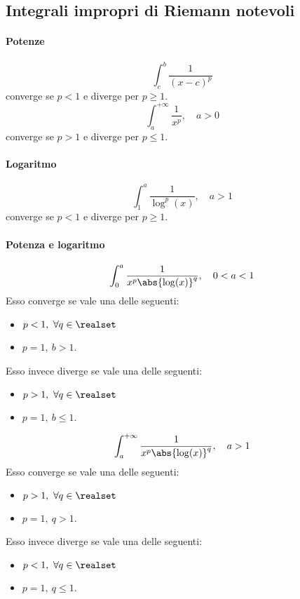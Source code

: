 \subsection{Integrali impropri di Riemann notevoli}
\paragraph{Potenze}
\begin{equation}
	\int_{c}^{b}\frac{1}{\left(x-c\right)^p}
\end{equation}
converge se $p<1$ e diverge per $p\geq 1$.
\begin{equation}
	\int_{a}^{+\infty}\frac{1}{x^p},\quad a>0
\end{equation}
converge se $p>1$ e diverge per $p\leq 1$.
\paragraph{Logaritmo}
\begin{equation}
	\int_{1}^{a}\frac{1}{\log^p(x)},\quad a>1
\end{equation}
converge se $p<1$ e diverge per $p\geq 1$.
\paragraph{Potenza e logaritmo}
\begin{equation}
	\int_{0}^{a}\frac{1}{x^p\abs{\log(x)}^{q}},\quad 0<a<1
\end{equation}
Esso converge se vale una delle seguenti:
\begin{itemize}
	\item $p<1,\ \forall q\in\realset$
	\item $p=1,\ b>1$.
\end{itemize}
Esso invece diverge se vale una delle seguenti:
\begin{itemize}
	\item $p>1,\ \forall q\in\realset$
	\item $p=1,\ b\leq 1$.
\end{itemize}
\begin{equation}
	\int_{a}^{+\infty}\frac{1}{x^p\abs{\log(x)}^{q}},\quad a>1
\end{equation}
Esso converge se vale una delle seguenti:
\begin{itemize}
	\item $p>1,\ \forall q\in\realset$
	\item $p=1,\ q>1$.
\end{itemize}
Esso invece diverge se vale una delle seguenti:
\begin{itemize}
	\item $p<1,\ \forall q\in\realset$
	\item $p=1,\ q\leq 1$.
\end{itemize}
